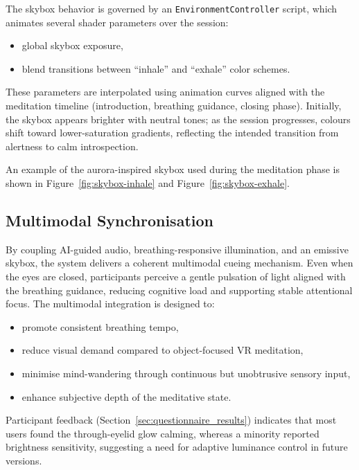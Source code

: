 The skybox behavior is governed by an \texttt{EnvironmentController} script, which animates several shader
parameters over the session:

\begin{itemize}
    \item global skybox exposure,
    \item blend transitions between ``inhale'' and ``exhale'' color schemes.
\end{itemize}

These parameters are interpolated using animation curves aligned with the
meditation timeline (introduction, breathing guidance, closing phase). Initially,
the skybox appears brighter with neutral tones; as the session progresses,
colours shift toward lower-saturation gradients, reflecting the intended transition
from alertness to calm introspection.

An example of the aurora-inspired skybox used during the meditation phase is shown in
Figure~\ref{fig:skybox-inhale} and Figure~\ref{fig:skybox-exhale}.


\subsection{Multimodal Synchronisation}

By coupling AI-guided audio, breathing-responsive illumination, and an
emissive skybox, the system delivers a coherent multimodal cueing mechanism.
Even when the eyes are closed, participants perceive a gentle pulsation of
light aligned with the breathing guidance, reducing cognitive load and
supporting stable attentional focus. The multimodal integration is designed to:

\begin{itemize}
    \item promote consistent breathing tempo,
    \item reduce visual demand compared to object-focused VR meditation,
    \item minimise mind-wandering through continuous but unobtrusive sensory input,
    \item enhance subjective depth of the meditative state.
\end{itemize}

Participant feedback (Section~\ref{sec:questionnaire_results}) indicates that most
users found the through-eyelid glow calming, whereas a minority reported
brightness sensitivity, suggesting a need for adaptive luminance control in
future versions.

